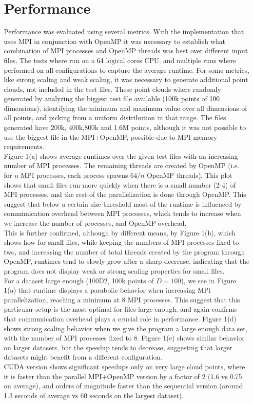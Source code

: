 \documentclass{article}
\begin{document}
\section*{Performance}
Performance was evaluated using several metrics. With the implementation that uses MPI in conjunction with OpenMP it was necessary to establish what combination of MPI processes and OpenMP threads was best over different input files. The tests where run on a 64 logical cores CPU, and multiple runs where performed on all configurations to capture the average runtime. For some metrics, like strong scaling and weak scaling, it was necessary to generate additional point clouds, not included in the test files. These point clouds where randomly generated by analyzing the biggest test file available (100k points of 100 dimensions), identifying the minimum and maximum value over all dimensions of all points, and picking from a uniform distribution in that range. The files generated have 200k, 400k,800k and 1.6M points, although it was not possible to use the biggest file in the MPI+OpenMP, possible due to MPI memory requirements. \\
Figure 1(a) shows average runtimes over the given test files with an increasing number of MPI processes. The remaining threads are created by OpenMP (i.e. for $n$ MPI processes, each process spawns $64/n$ OpenMP threads).
This plot shows that small files run more quickly when there is a small number (2-4) of MPI processes, and the rest of the parallelization is done through OpenMP. This suggest that below a certain size threshold most of the runtime is influenced by communication overhead between MPI processes, which tends to increase when we increase the number of processes, and OpenMP overhead.\\
This is further confirmed, although by different means, by Figure 1(b), which shows how for small files, while keeping the numbers of MPI processes fixed to two, and increasing the number of total threads created by the program through OpenMP, runtimes tend to slowly grow after a sharp decrease, indicating that the program does not display weak or strong scaling properties for small files.\\
For a dataset large enough (100D2, 100k points of $D=100$), we see in Figure 1(a) that runtime displays a parabolic behavior when increasing MPI parallelization, reaching a minimum at 8 MPI processes. This suggest that this particular setup is the most optimal for files large enough, and again confirms that communication overhead plays a crucial role in performance. Figure 1(d) shows strong scaling behavior when we give the program a large enough data set, with the number of MPI processes fixed to 8. Figure 1(e) shows similar behavior on larger datasets, but the speedup tends to decrease, suggesting that larger datasets might benefit from a different configuration.\\
CUDA version shows significant speedups only on very large cloud points, where it is faster than the parallel MPI+OpenMP version by a factor of 2 (1.6 vs 0.75 on average), and orders of magnitude faster than the sequential version (around 1.3 seconds of average vs 60 seconds on the largest dataset).
\end{document}
